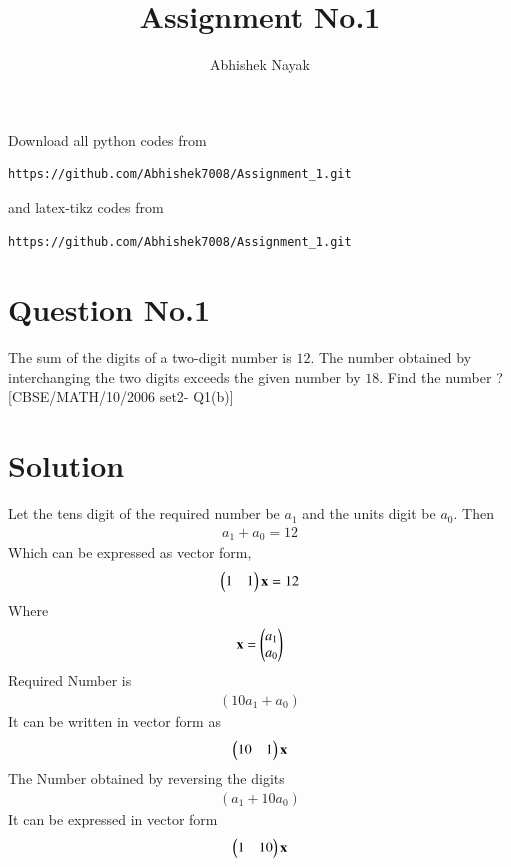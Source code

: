 \documentclass[journal,12pt,twocolumn]{IEEEtran}
\begin{document}
\def\rightbox#1{\makebox[0in][r]{#1}}
\def\centbox#1{\makebox[0in]{#1}}
\def\topbox#1{\raisebox{-\baselineskip}[0in][0in]{#1}}
\def\midbox#1{\raisebox{-0.5\baselineskip}[0in][0in]{#1}}
\vspace{3cm}
\title{Assignment No.1}
\author{Abhishek Nayak}
\maketitle
\newpage
\bigskip
\renewcommand{\thefigure}{\theenumi}
\renewcommand{\thetable}{\theenumi}
Download all python codes from
\begin{lstlisting}
https://github.com/Abhishek7008/Assignment_1.git
\end{lstlisting}
%
and latex-tikz codes from
%
\begin{lstlisting}
https://github.com/Abhishek7008/Assignment_1.git
\end{lstlisting}
%
\section{Question No.1}
The sum of the digits of a two-digit number is $12$. The number obtained by interchanging the two digits exceeds the given number by $18$. Find the number ?
[CBSE/MATH/10/2006 set2- Q1(b)]
\section{Solution}
Let the tens digit of the required number be ${a_1}$ and the units digit be ${a_0}$. Then
\begin{align}
    {a_1}+{a_0}=12
\end{align}
Which can be expressed as vector form,
\begin{align}
     \begin{pmatrix}1&1\end{pmatrix}\mathbf{x}=12\label{eq1}
\end{align}
Where\\
\begin{align}
    \mathbf{x}=\begin{pmatrix}a_1\\a_0\end{pmatrix}
\end{align} 
Required Number is 
\begin{align}
(10{a_1}+{a_0})
\end{align}
 It can be written in vector form as
\begin{align}
    \begin{pmatrix}10&1\end{pmatrix}\mathbf{x}
\end{align}
The Number obtained by reversing the digits\
\begin{align}
    ({a_1}+10{a_0})
\end{align}
It can be expressed in vector form 
\begin{align}
    \begin{pmatrix}1&10\end{pmatrix}\mathbf{x}
\end{align}
 
\end{document}
